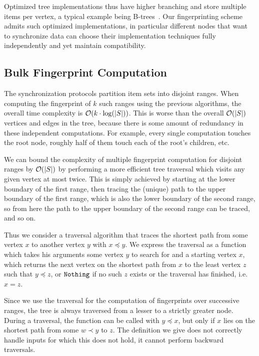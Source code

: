 Optimized tree implementations thus have higher branching and store multiple items per vertex, a typical example being B-trees~\cite{bayer2002organization}. Our fingerprinting scheme admits such optimized implementations, in particular different nodes that want to synchronize data can choose their implementation techniques fully independently and yet maintain compatibility.

\subsection{Bulk Fingerprint Computation}
\label{bulk}

The synchronization protocols partition item sets into disjoint ranges. When computing the fingerprint of $k$ such ranges using the previous algorithms, the overall time complexity is $\mathcal{O}(k \cdot \log(|{S}|))$. This is worse than the overall $\mathcal{O}(|{S}|)$ vertices and edges in the tree, because there is some amount of redundancy in these independent computations. For example, every single computation touches the root node, roughly half of them touch each of the root's children, etc.

We can bound the complexity of multiple fingerprint computation for disjoint ranges by $\mathcal{O}(|{S}|)$ by performing a more efficient tree traversal which visits any given vertex at most twice. This is simply achieved by starting at the lower boundary of the first range, then tracing the (unique) path to the upper boundary of the first range, which is also the lower boundary of the second range, so from here the path to the upper boundary of the second range can be traced, and so on.

Thus we consider a traversal algorithm that traces the shortest path from some vertex $x$ to another vertex $y$ with $x \preceq y$. We express the traversal as a function which takes his arguments some vertex $y$ to search for and a starting vertex $x$, which returns the next vertex on the shortest path from $x$ to the least vertex $z$ such that $y \preceq z$, or $\mathtt{Nothing}$ if no such $z$ exists or the traversal has finished, i.e. $x = z$.

Since we use the traversal for the computation of fingerprints over successive ranges, the tree is always traversed from a lesser to a strictly greater node. During a traversal, the function can be called with $y \preceq x$, but only if $x$ lies on the shortest path from some $w \prec y$ to $z$. The definition we give does not correctly handle inputs for which this does not hold, it cannot perform backward traversals.

